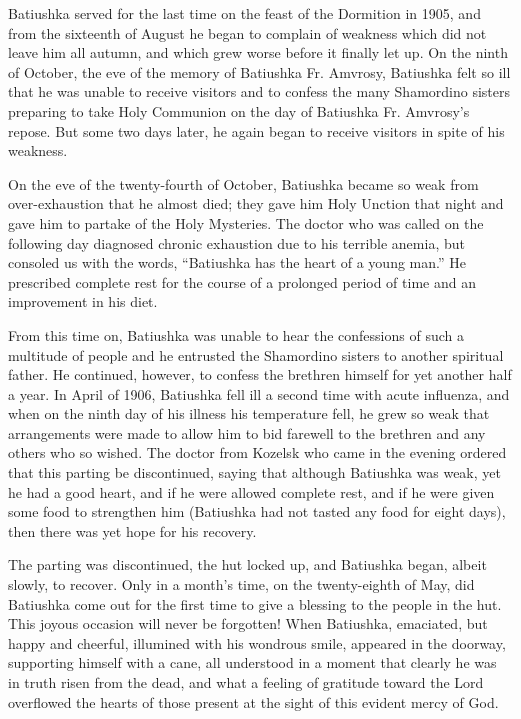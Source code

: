 Batiushka served for the last time on the feast of the Dormition in 1905, and from the sixteenth of August he began to complain of weakness which did not leave him all autumn, and which grew worse before it finally let up. On the ninth of October, the eve of the memory of Batiushka Fr. Amvrosy, Batiushka felt so ill that he was unable to receive visitors and to confess the many Shamordino sisters preparing to take Holy Communion on the day of Batiushka Fr. Amvrosy's repose. But some two days later, he again began to receive visitors in spite of his weakness.

On the eve of the twenty-fourth of October, Batiushka became so weak from over-exhaustion that he almost died; they gave him Holy Unction that night and gave him to partake of the Holy Mysteries. The doctor who was called on the following day diagnosed chronic exhaustion due to his terrible anemia, but consoled us with the words, “Batiushka has the heart of a young man.” He prescribed complete rest for the course of a prolonged period of time and an improvement in his diet.

From this time on, Batiushka was unable to hear the confessions of such a multitude of people and he entrusted the Shamordino sisters to another spiritual father. He continued, however, to confess the brethren himself for yet another half a year. In April of 1906, Batiushka fell ill a second time with acute influenza, and when on the ninth day of his illness his temperature fell, he grew so weak that arrangements were made to allow him to bid farewell to the brethren and any others who so wished. The doctor from Kozelsk who came in the evening ordered that this parting be discontinued, saying that although Batiushka was weak, yet he had a good heart, and if he were allowed complete rest, and if he were given some food to strengthen him (Batiushka had not tasted any food for eight days), then there was yet hope for his recovery.

The parting was discontinued, the hut locked up, and Batiushka began, albeit slowly, to recover. Only in a month's time, on the twenty-eighth of May, did Batiushka come out for the first time to give a blessing to the people in the hut. This joyous occasion will never be forgotten! When Batiushka, emaciated, but happy and cheerful, illumined with his wondrous smile, appeared in the doorway, supporting himself with a cane, all understood in a moment that clearly he was in truth risen from the dead, and what a feeling of gratitude toward the Lord overflowed the hearts of those present at the sight of this evident mercy of God.

